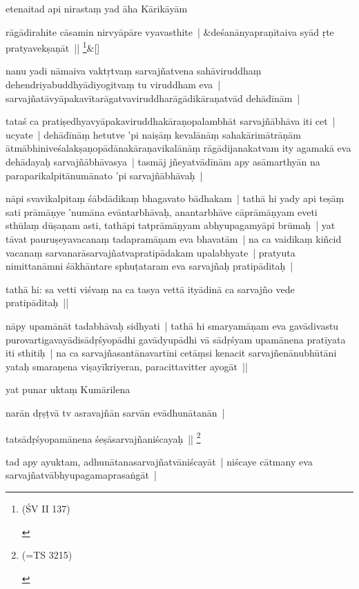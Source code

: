 \documentclass[article,12pt,a4paper]{memoir}
\begin{document}
	  \pstart etenaitad api nirastaṃ yad āha Kārikāyām 
	\pend
      
	    
	    \stanza[\smallbreak]
	rāgādirahite cāsamin nirvyāpāre vyavasthite | &deśanānyapraṇītaiva syād ṛte pratyavekṣaṇāt || \footnote{\begin{english}(ŚV II 137)\end{english}}\&[\smallbreak]


	

	  \pstart nanu yadi nāmaiva vaktṛtvaṃ sarvajñatvena sahāviruddhaṃ dehendriyabuddhyādiyogitvaṃ tu viruddham eva | sarvajñatāvyāpakavītarāgatvaviruddharāgādikāraṇatvād dehādīnām | 
	\pend
      

	  \pstart tataś ca pratiṣedhyavyāpakaviruddhakāraṇopalambhāt sarvajñābhāva iti cet | ucyate | dehādīnāṃ hetutve 'pi naiṣāṃ kevalānāṃ sahakārimātrāṇām ātmābhiniveśalakṣaṇopādānakāraṇavikalānāṃ rāgādijanakatvam ity agamakā eva dehādayaḥ sarvajñābhāvasya | tasmāj jñeyatvādīnām apy asāmarthyān na paraparikalpitānumānato 'pi sarvajñābhāvaḥ | 
	\pend
      

	  \pstart nāpi svavikalpitaṃ śābdādikaṃ bhagavato bādhakam | tathā hi yady api teṣāṃ sati prāmāṇye 'numāna evāntarbhāvaḥ, anantarbhāve cāprāmāṇyam eveti sthūlaṃ dūṣaṇam asti, tathāpi tatprāmāṇyam abhyupagamyāpi brūmaḥ | yat tāvat pauruṣeyavacanaṃ tadapramāṇam eva bhavatām | na ca vaidikaṃ kiñcid vacanaṃ sarvanarāsarvajñatvapratipādakam upalabhyate | pratyuta nimittanāmni śākhāntare sphuṭataram eva sarvajñaḥ pratipāditaḥ | 
	\pend
      

	  \pstart tathā hi: sa vetti viśvaṃ na ca tasya vettā ityādinā ca sarvajño vede pratipāditaḥ || 
	\pend
      

	  \pstart nāpy upamānāt tadabhāvaḥ sidhyati | tathā hi smaryamāṇam eva gavādivastu purovartigavayādisādṛśyopādhi gavādyupādhi vā sādṛśyam upamānena pratīyata iti sthitiḥ | na ca sarvajñasantānavartīni cetāṃsi kenacit sarvajñenānubhūtāni yataḥ smaraṇena viṣayīkriyeran, paracittavitter ayogāt || 
	\pend
      

	  \pstart yat punar uktaṃ Kumārilena 
	\pend
      

	  \pstart narān dṛṣṭvā tv asravajñān sarvān evādhunātanān | 
	\pend
      

	  \pstart tatsādṛśyopamānena śeṣāsarvajñaniścayaḥ || \footnote{\begin{english}(=TS 3215)\end{english}}
	\pend
      

	  \pstart tad apy ayuktam, adhunātanasarvajñatvāniścayāt | niścaye cātmany eva sarvajñatvābhyupagamaprasaṅgāt | 
	\pend
      
\end{document}
